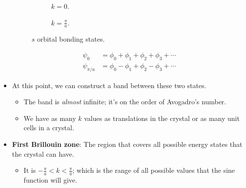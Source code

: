 \documentclass[../notes.tex]{subfiles}
\begin{document}
\begin{itemize}
    \begin{figure}[h!]
        \centering
        \begin{subfigure}[b]{0.35\linewidth}
            \centering
            \caption{$k=0$.}
            \label{fig:bandBonding-sa}
        \end{subfigure}
        \begin{subfigure}[b]{0.35\linewidth}
            \centering
            \caption{$k=\frac{\pi}{a}$.}
            \label{fig:bandBonding-sb}
        \end{subfigure}
        \caption{$s$ orbital bonding states.}
        \label{fig:bandBonding-s}
    \end{figure}
    \begin{align*}
        \psi_0 &= \phi_0+\phi_1+\phi_2+\phi_3+\cdots\\
        \psi_{\pi/a} &= \phi_0-\phi_1+\phi_2-\phi_3+\cdots
    \end{align*}
    \item At this point, we can construct a band between these two states.
    \begin{itemize}
        \item The band is \emph{almost} infinite; it's on the order of Avogadro's number.
        \item We have as many $k$ values as translations in the crystal or as many unit cells in a crystal.
    \end{itemize}
    \item \textbf{First Brillouin zone}: The region that covers all possible energy states that the crystal can have.
    \begin{itemize}
        \item It is $-\frac{\pi}{a}<k<\frac{\pi}{a}$; which is the range of all possible values that the sine function will give.

\end{itemize}
\end{itemize}
\end{document}
